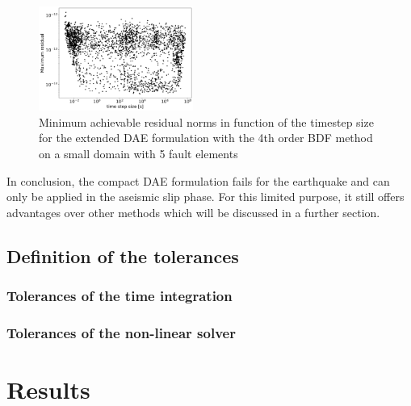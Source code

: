 \begin{figure}[H]
	\centering
	\includegraphics[width=0.45\textwidth]{images/TANDEMConvergenceAnalysisExtendedDAEMaxResidual_Size5.png}
	\caption{Minimum achievable residual norms in function of the timestep size for the extended DAE formulation with the 4th order BDF method on a small domain with 5 fault elements}
	\label{fig:convergenceIssuesExtendedDAEMaxResidual_vs_dt}
\end{figure}

In conclusion, the compact DAE formulation fails for the earthquake and can only be applied in the aseismic slip phase. For this limited purpose, it still offers advantages over other methods which will be discussed in a further section.
 
\subsection{Definition of the tolerances}
\subsubsection{Tolerances of the time integration}
\subsubsection{Tolerances of the non-linear solver}

\section{Results}
